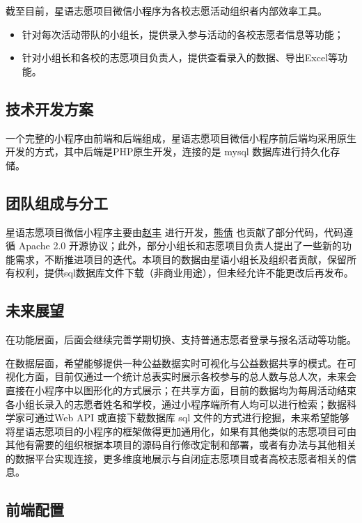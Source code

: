 \documentclass[]{ctexart}
\begin{document}
截至目前，星语志愿项目微信小程序为各校志愿活动组织者内部效率工具。

\begin{itemize}
\item
  针对每次活动带队的小组长，提供录入参与活动的各校志愿者信息等功能；
\item
  针对小组长和各校的志愿项目负责人，提供查看录入的数据、导出Excel等功能。
\end{itemize}

\subsection{技术开发方案}\label{ux6280ux672fux5f00ux53d1ux65b9ux6848}

一个完整的小程序由前端和后端组成，星语志愿项目微信小程序前后端均采用原生开发的方式，其中后端是PHP原生开发，连接的是
mysql 数据库进行持久化存储。

\subsection{团队组成与分工}\label{ux56e2ux961fux7ec4ux6210ux4e0eux5206ux5de5}

星语志愿项目微信小程序主要由\href{https://github.com/zhaofeng-shu33}{赵丰}
进行开发，\href{https://github.com/Prisicilla}{熊倩}
也贡献了部分代码，代码遵循 Apache 2.0 开源协议；此外，部分小组长和志愿项目负责人提出了一些新的功能需求，不断推进项目的迭代。本项目的数据由星语小组长及组织者贡献，保留所有权利，提供sql数据库文件下载（非商业用途），但未经允许不能更改后再发布。

\subsection{未来展望}
在功能层面，后面会继续完善学期切换、支持普通志愿者登录与报名活动等功能。

在数据层面，希望能够提供一种公益数据实时可视化与公益数据共享的模式。在可视化方面，目前仅通过一个统计总表实时展示各校参与的总人数与总人次，未来会直接在小程序中以图形化的方式展示；在共享方面，目前的数据均为每周活动结束各小组长录入的志愿者姓名和学校，通过小程序端所有人均可以进行检索；数据科学家可通过Web API 或直接下载数据库 sql 文件的方式进行挖掘，未来希望能够将星语志愿项目的小程序的框架做得更加通用化，如果有其他类似的志愿项目可由其他有需要的组织根据本项目的源码自行修改定制和部署，或者有办法与其他相关的数据平台实现连接，更多维度地展示与自闭症志愿项目或者高校志愿者相关的信息。

\subsection{前端配置}\label{ux524dux7aefux914dux7f6e}
\end{document}
